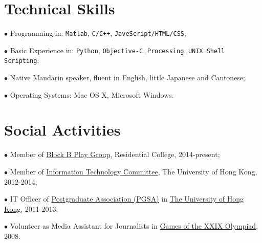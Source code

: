 \documentclass[10pt]{article}
\renewcommand{\section}[2]%
        {\pagebreak[2]\vspace{1.3\baselineskip}%
         \phantomsection\addcontentsline{toc}{section}{#1}%
         \hspace{0in}%
         \marginpar{
         \raggedright \scshape #1}#2}
\begin{document}

\section{Technical Skills}
$\bullet$ Programming in: \texttt{Matlab}, \texttt{C/C++}, \texttt{JaveScript/HTML/CSS};

$\bullet$ Basic Experience in: \texttt{Python}, \texttt{Objective-C}, \texttt{Processing}, \texttt{UNIX Shell Scripting};

$\bullet$ Native Mandarin speaker, fluent in English, little Japanese and Cantonese;

$\bullet$ Operating Systems: Mac OS X, Microsoft Windows.


\section{Social Activities}
$\bullet$ Member of \href{http://hkurcblockb.com}{Block B Play Group}, Residential College, 2014-present;

$\bullet$ Member of \href{http://intraweb.hku.hk/local/its/itc.html}{Information Technology Committee}, The University of Hong Kong, 2012-2014;

$\bullet$ IT Officer of \href{http://www.pgsa.hku.hk/}{Postgraduate Association (PGSA)} in
 \href{http://www.hku.hk/}{The University of Hong Kong}, 2011-2013;

$\bullet$ Volunteer as Media Assistant for Journalists in \href{http://en.wikipedia.org/wiki/2008_Summer_Olympics}{Games of the XXIX Olympiad}, 2008.
\end{document}
